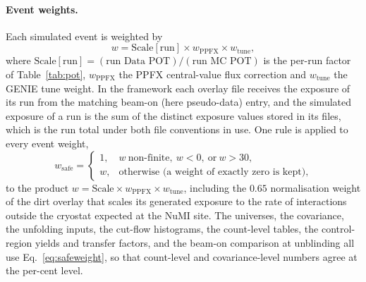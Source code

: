 \documentclass[11pt,a4paper]{article}
\begin{document}
\paragraph{Event weights.}
Each simulated event is weighted by
\begin{equation}
  w = \text{Scale}[\text{run}] \times w_{\mathrm{PPFX}} \times w_{\mathrm{tune}},
\end{equation}
where $\text{Scale}[\text{run}] = (\text{run Data POT})/(\text{run MC POT})$ is the per-run factor
of Table~\ref{tab:pot}, $w_{\mathrm{PPFX}}$ the PPFX central-value flux correction and
$w_{\mathrm{tune}}$ the GENIE tune weight. In the framework each overlay file receives the exposure
of its run from the matching beam-on (here pseudo-data) entry, and the simulated exposure of a run is
the sum of the distinct exposure values stored in its files, which is the run total under both
file conventions in use. One rule is applied to every event weight,
\begin{equation}
  w_{\mathrm{safe}} = \begin{cases} 1, & w\ \text{non-finite},\ w<0,\ \text{or}\ w>30,\\
  w, & \text{otherwise (a weight of exactly zero is kept)},\end{cases}
  \label{eq:safeweight}
\end{equation}
to the product $w=\text{Scale}\times w_{\mathrm{PPFX}}\times w_{\mathrm{tune}}$, including the
$0.65$ normalisation weight of the dirt overlay that scales its generated exposure to the rate of
interactions outside the cryostat expected at the NuMI site. The universes, the covariance, the
unfolding inputs, the cut-flow histograms, the count-level tables, the control-region yields and
transfer factors, and the beam-on comparison at unblinding all use Eq.~\eqref{eq:safeweight}, so
that count-level and covariance-level numbers agree at the per-cent level.
\end{document}
